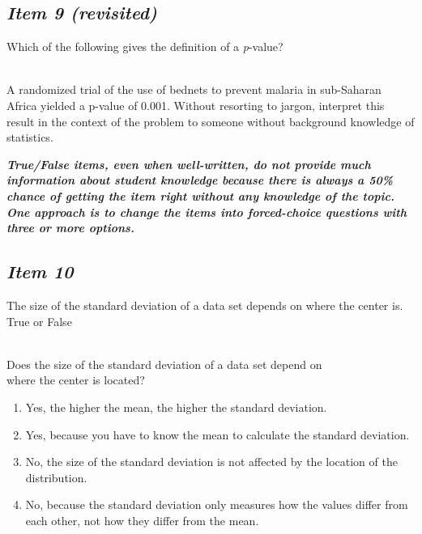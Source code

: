 \subsection{\textbf{\textit{Item 9 (revisited)}}}
Which of the following gives the definition of a \textit{p}-value?
\vspace{8pt}

\noindent{} \\
 A randomized trial of the
use of bednets to prevent malaria in sub-Saharan Africa yielded a p-value of 0.001.  Without resorting to jargon, interpret this result in the context of the problem to someone without background knowledge of statistics.

\vspace{8pt}
\textbf{\textit{True/False items, even when well-written, do not provide much information about student knowledge because there is always a 50\% chance of getting the item right without any knowledge of the topic. One approach is to change the items into forced-choice questions with three or more options.}}

\subsection{\textbf{\textit{Item 10}}}
The size of the standard deviation of a data set depends on where the center is. True or False\\
\vspace{8pt}

\noindent{} \\
 Does the size of the standard deviation of a data set depend on \\ \indent where the center is located?
\begin{enumerate} [leftmargin=1.5cm, itemsep=.2em]
\item Yes, the higher the mean, the higher the standard deviation.
\item Yes, because you have to know the mean to calculate the standard deviation.
\item No, the size of the standard deviation is not affected by the location of the distribution.
\item No, because the standard deviation only measures how the values differ from each other, not how they differ from the mean.
 \end{enumerate}


